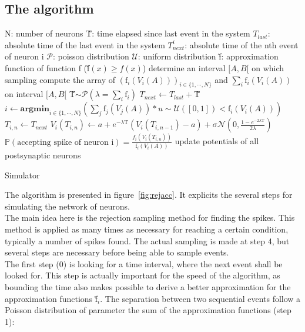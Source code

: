 \documentclass{article}
\begin{document}
	\subsection{The algorithm}
		\begin{algorithm}
			\begin{algorithmic}[1]
				\State N: number of neurons
				\State \~T: time elapsed since last event in the system
				\State $T_{last}$: absolute time of the last event in the system
				\State $T_{next}^i$: absolute time of the nth event of neuron i
				\State $\mathscr{P}$: poisson distribution
				\State $\mathscr{U}$: uniform distribution
				\State \~f: approximation function of function f (\~f$(x)\ge f(x)$)
				\Repeat
					\Repeat{}
						\State determine an interval $[A,B[$ on which sampling
						\State compute the array of $(\text{\~f}_i(V_i(A)))_{i\in\{1,\cdots,N\}}$ and $\sum_i\text{\~f}_i(V_i(A))$ on interval $[A,B[$
						\State \~T$\sim\mathscr{P}(\lambda=\sum_i\text{\~f}_i)$
						\State $T_{next}\gets T_{last}+$\~T
					\State $i\gets\textbf{argmin}_{i\in\{1,\cdots,N\}}\left(\sum_j \text{\~f}_j(V_j(A)) * u\sim\mathscr{U}([0,1])<\text{\~f}_i(V_i(A))\right)$
					\State $T_{i,n}\gets T_{next}$
					\State $V_i(T_{i,n})\gets a+e^{-\lambda\text{\~T}}(V_i(T_{i,n-1})-a)+\sigma\mathscr{N}(0,\frac{1-e^{-2\lambda\text{\~T}}}{2\lambda})$
					\State $\mathbb{P}(\text{accepting spike of neuron i})=\frac{f_i(V_i(T_{i,n}))}{\text{\~f}_i(V_i(A))}$
						\State update potentials of all postsynaptic neurons
					\EndIf
			\end{algorithmic}
			\caption{Simulator}\label{alg:rejacc}
		\end{algorithm}
		\indent The algorithm is presented in figure~\ref{fig:rejacc}. It explicits the several steps for simulating the network of neurons.\\\indent
		The main idea here is the rejection sampling method for finding the spikes. This method is applied as many times as necessary for reaching a certain condition, typically a number of spikes found. The actual sampling is made at step 4, but several steps are necessary before being able to sample events.\\\indent
		The first step (0) is looking for a time interval, where the next event shall be looked for. This step is actually important for the speed of the algorithm, as bounding the time also makes possible to derive a better approximation for the approximation functions \~f$_i$. The separation between two sequential events follow a Poisson distribution of parameter the sum of the approximation functions (step 1):
\end{document}
